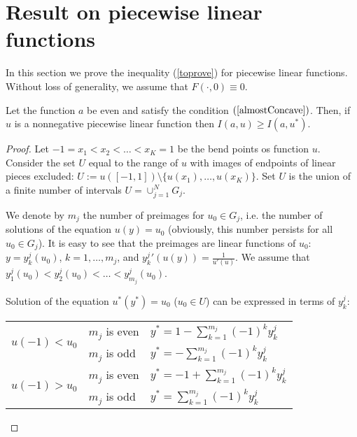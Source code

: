 \section{ Result on piecewise linear functions }

\rm
In this section we prove the inequality (\ref{toprove}) for piecewise linear functions.
Without loss of generality, we assume that $F(\cdot, 0) \equiv 0$.

\begin{thm}
\label{linth}
Let the function $a$ be even and satisfy the condition $(\ref{almostConcave})$.
Then, if $u$ is a nonnegative piecewise linear function then $I(a, u) \ge I(a, u^*)$.
\end{thm}

\begin{proof}
Let $-1 = x_1 < x_2 < \dots < x_K = 1$ be the bend points os function $u$.
Consider the set $U$ equal to the range of $u$ with images of endpoints of linear pieces excluded:
$U := u( [-1, 1] ) \setminus \{ u(x_1), \dots, u(x_K) \}$.
Set $U$ is the union of a finite number of intervals $U = \cup_{j = 1}^N G_j$.

We denote by $m_j$ the number of preimages for $u_0 \in G_j$,
i.e. the number of solutions of the equation $u(y) = u_0$
(obviously, this number persists for all $u_0 \in G_j$).
It is easy to see that the preimages are linear functions of $u_0$:
$y = y_k^j(u_0)$, $k = 1, \dots, m_j$,
and $y_k^j{}'(u(y)) = \frac{1}{u'(u)}$.
We assume that $y_1^j(u_0) < y_2^j(u_0) < \dots < y_{m_j}^j(u_0)$.

Solution of the equation $u^*(y^*)=u_0$ ($u_0 \in U$) can be expressed in terms of $y_k^j$:

\begin{center}
\begin{tabular}{l|l|l} 
\multirow{2}{*}{$u(-1)<u_0$ \rule[-34pt]{0pt}{65pt}} & $m_j$ is even & $y^*=1-\sum\limits_{k=1}^{m_j} (-1)^k y_k^j$ \rule[-17pt]{0pt}{40pt} \\
                                                     & $m_j$ is odd  & $y^*=-\sum\limits_{k=1}^{m_j} (-1)^k y_k^j$ \rule[-17pt]{0pt}{40pt} \\ \hline
\multirow{2}{*}{$u(-1)>u_0$ \rule[-34pt]{0pt}{65pt}} & $m_j$ is even & $y^*=-1+\sum\limits_{k=1}^{m_j} (-1)^k y_k^j$ \rule[-17pt]{0pt}{40pt} \\
                                                     & $m_j$ is odd  & $y^*=\sum\limits_{k=1}^{m_j} (-1)^k y_k^j$ \rule[-17pt]{0pt}{40pt} \\ 
\end{tabular}
\end{center}


\end{proof}
